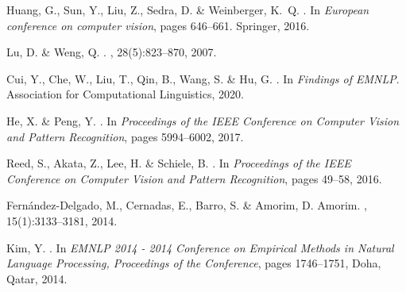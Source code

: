 \documentclass[review]{cvpr}
\begin{document}
{\begin{thebibliography}{10}
Huang, G., Sun, Y., Liu, Z., Sedra, D. \&  Weinberger, K.~Q.
.
\newblock In {\em European conference on computer vision}, pages 646--661.
  Springer, 2016.



Lu, D. \&  Weng, Q.
.
, 28(5):823--870, 2007.


Cui, Y., Che, W., Liu, T., Qin, B., Wang, S. \&  Hu, G.
.
\newblock In {\em Findings of EMNLP}. Association for Computational
  Linguistics, 2020.


He, X. \&  Peng, Y.
.
\newblock In {\em Proceedings of the IEEE Conference on Computer Vision and
  Pattern Recognition}, pages 5994--6002, 2017.


Reed, S., Akata, Z., Lee, H. \&  Schiele, B.
.
\newblock In {\em Proceedings of the IEEE Conference on Computer Vision and
  Pattern Recognition}, pages 49--58, 2016.


Fern{\'{a}}ndez-Delgado, M., Cernadas, E., Barro, S. \&  Amorim, D.
  Amorim.
, 15(1):3133--3181,
  2014.



Kim, Y.
.
\newblock In {\em EMNLP 2014 - 2014 Conference on Empirical Methods in Natural
  Language Processing, Proceedings of the Conference}, pages 1746--1751, Doha,
  Qatar, 2014.



\end{thebibliography}
}
\end{document}
